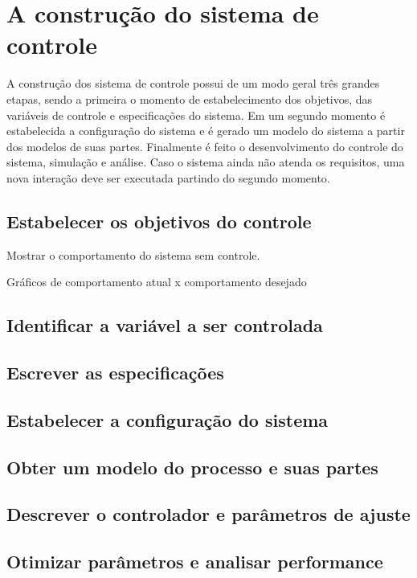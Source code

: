 
\section{ A construção do sistema de controle }	

A construção dos sistema de controle possui de um modo geral três grandes etapas, sendo a primeira o momento de estabelecimento dos objetivos, das variáveis de controle e especificações do sistema. Em um segundo momento é estabelecida a configuração do sistema e é gerado um modelo do sistema a partir dos modelos de suas partes. Finalmente é feito o desenvolvimento do controle do sistema, simulação e análise. Caso o sistema ainda não atenda os requisitos, uma nova interação deve ser executada partindo do segundo momento.

\subsection{ Estabelecer os objetivos do controle }

Mostrar o comportamento do sistema sem controle.

Gráficos de comportamento atual x comportamento desejado

\subsection{ Identificar a variável a ser controlada }
\subsection{ Escrever as especificações }
\subsection{ Estabelecer a configuração do sistema }
\subsection{ Obter um modelo do processo e suas partes }
\subsection{ Descrever o controlador e parâmetros de ajuste }
\subsection{ Otimizar parâmetros e analisar performance }


